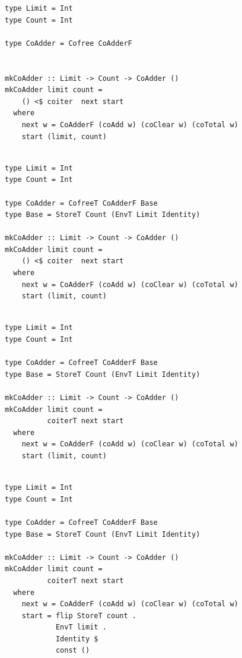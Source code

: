 \documentclass{beamer}
\begin{document}
\begin{frame}[fragile]
  \begin{overprint}
  \begin{verbatim}
type Limit = Int
type Count = Int

type CoAdder = Cofree CoAdderF


mkCoAdder :: Limit -> Count -> CoAdder ()
mkCoAdder limit count =
    () <$ coiter  next start
  where
    next w = CoAdderF (coAdd w) (coClear w) (coTotal w)
    start (limit, count)


  \end{verbatim}
  \begin{verbatim}
type Limit = Int
type Count = Int

type CoAdder = CofreeT CoAdderF Base
type Base = StoreT Count (EnvT Limit Identity)

mkCoAdder :: Limit -> Count -> CoAdder ()
mkCoAdder limit count =
    () <$ coiter  next start
  where
    next w = CoAdderF (coAdd w) (coClear w) (coTotal w)
    start (limit, count)


  \end{verbatim}
  \begin{verbatim}
type Limit = Int
type Count = Int

type CoAdder = CofreeT CoAdderF Base
type Base = StoreT Count (EnvT Limit Identity)

mkCoAdder :: Limit -> Count -> CoAdder ()
mkCoAdder limit count =
          coiterT next start
  where
    next w = CoAdderF (coAdd w) (coClear w) (coTotal w)
    start (limit, count)


  \end{verbatim}
  \begin{verbatim}
type Limit = Int
type Count = Int

type CoAdder = CofreeT CoAdderF Base
type Base = StoreT Count (EnvT Limit Identity)

mkCoAdder :: Limit -> Count -> CoAdder ()
mkCoAdder limit count =
          coiterT next start
  where
    next w = CoAdderF (coAdd w) (coClear w) (coTotal w)
    start = flip StoreT count .
            EnvT limit .
            Identity $
            const ()
  \end{verbatim}
  \end{overprint}
\end{frame}

\end{document}
